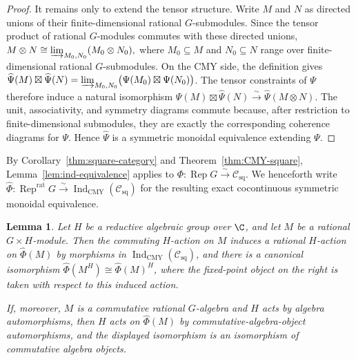 \documentclass[12pt,leqno]{amsart}
\numberwithin{equation}{section} \newtheorem{thm}{Theorem}[section] \newtheorem{lem}[thm]{Lemma} \newtheorem{ex}[thm]{Example} \newtheorem{prop}[thm]{Proposition} \newtheorem{cor}[thm]{Corollary} \newtheorem{defi}[thm]{Definition} \newtheorem{rmk}[thm]{Remark} \newtheorem{notation}[thm]{Notation}
\newcommand{\Rep}{\operatorname{Rep}}
\newcommand{\Csq}{\mathcal C_{\mathrm{sq}}}
\newcommand{\IndCMY}{\operatorname{Ind}_{\mathrm{CMY}}}
\begin{document}
\begin{proof}
It remains only to extend the tensor structure. Write $M$ and $N$ as directed unions of their finite-dimensional rational $G$-submodules. Since the tensor product of rational $G$-modules commutes with these directed unions, \(M\otimes N\cong\varinjlim_{M_0,N_0}(M_0\otimes N_0),\) where $M_0\subseteq M$ and $N_0\subseteq N$ range over finite-dimensional rational $G$-submodules. On the CMY side, the definition gives \(\widehat\Psi(M)\boxtimes\widehat\Psi(N) = \varinjlim_{M_0,N_0} \bigl(\Psi(M_0)\boxtimes\Psi(N_0)\bigr)\). The tensor constraints of $\Psi$ therefore induce a natural isomorphism \(\widehat\Psi(M)\boxtimes\widehat\Psi(N) \overset{\sim}{\longrightarrow} \widehat\Psi(M\otimes N)\). The unit, associativity, and symmetry diagrams commute because, after restriction to finite-dimensional submodules, they are exactly the corresponding coherence diagrams for $\Psi$. Hence $\widehat\Psi$ is a symmetric monoidal equivalence extending $\Psi$.
\end{proof}

By Corollary~\ref{thm:square-category} and Theorem~\ref{thm:CMY-square}, Lemma~\ref{lem:ind-equivalence} applies to \(\Phi:\Rep G\overset\sim\longrightarrow\Csq\). We henceforth write \(\widehat\Phi:\Rep^{\mathrm{rat}}G\overset\sim\longrightarrow\IndCMY(\Csq)\) for the resulting exact cocontinuous symmetric monoidal equivalence.

\begin{lem}\label{lem:ind-equivariance}
Let $H$ be a reductive algebraic group over $\C$, and let $M$ be a rational $G\times H$-module. Then the commuting $H$-action on $M$ induces a rational $H$-action on $\widehat\Phi(M)$ by morphisms in $\IndCMY(\Csq)$, and there is a canonical isomorphism \(\widehat\Phi(M^H)\cong\widehat\Phi(M)^H\), where the fixed-point object on the right is taken with respect to this induced action.

If, moreover, $M$ is a commutative rational $G$-algebra and $H$ acts by algebra automorphisms, then $H$ acts on $\widehat\Phi(M)$ by commutative-algebra-object automorphisms, and the displayed isomorphism is an isomorphism of commutative algebra objects.
\end{lem}
\end{document}
